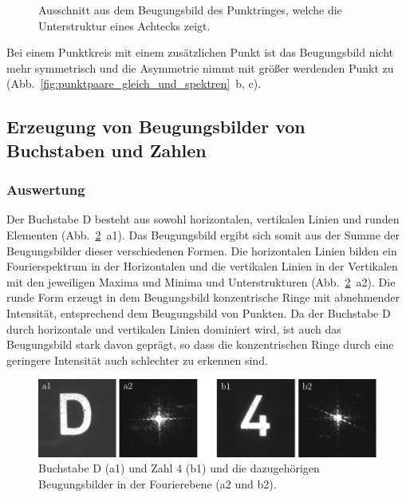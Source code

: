 \begin{figure}[h]
	\centering
	\caption[Beugungsbild der Punktringe mit vergrößertem Ausschnitt]{
		Ausschnitt aus dem Beugungsbild des Punktringes, welche die Unterstruktur eines Achtecks zeigt.
	}
	\label{fig:punktringe_ausschnitt}
\end{figure}

Bei einem Punktkreis mit einem zusätzlichen Punkt ist das Beugungsbild nicht mehr symmetrisch und die Asymmetrie nimmt mit größer werdenden Punkt zu (Abb.~\ref{fig:punktpaare_gleich_und_spektren}~b, c).


\subsection{Erzeugung von Beugungsbilder von Buchstaben und Zahlen}
\subsubsection*{Auswertung}

Der Buchstabe D besteht aus sowohl horizontalen, vertikalen Linien und runden Elementen (Abb.~\ref{fig:ziffern_mit_spektren}~a1). Das Beugungsbild ergibt sich somit aus der Summe der Beugungsbilder dieser verschiedenen Formen. Die horizontalen Linien bilden ein Fourierspektrum in der Horizontalen und die vertikalen Linien in der Vertikalen mit den jeweiligen Maxima und Minima und Unterstrukturen (Abb.~\ref{fig:ziffern_mit_spektren}~a2). Die runde Form erzeugt in dem Beugungsbild konzentrische Ringe mit abnehmender Intensität, entsprechend dem Beugungsbild von Punkten. Da der Buchstabe D durch horizontale und vertikalen Linien dominiert wird, ist auch das Beugungsbild stark davon geprägt, so dass die konzentrischen Ringe durch eine geringere Intensität auch schlechter zu erkennen sind.

\begin{figure}[h]
	\centering
	\includegraphics{images/Regina/abb19.pdf}
	\caption[Ziffern mit Fourierspektren]{
		Buchstabe D (a1) und Zahl 4 (b1) und die dazugehörigen Beugungsbilder in der Fourierebene (a2 und b2).
	}
	\label{fig:ziffern_mit_spektren}
\end{figure}

